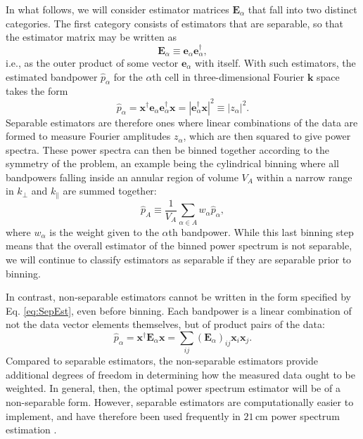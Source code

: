 \documentclass[twocolumn,aps,prd,nofootinbib,showpacs]{revtex4-1}
\begin{document}
In what follows, we will consider estimator matrices $\mathbf{E}_\alpha$ that fall into two distinct categories.  The first category consists of estimators that are separable, so that the estimator matrix may be written as
\begin{equation}
\label{eq:SepEst}
\mathbf{E}_\alpha \equiv \mathbf{e}_\alpha \mathbf{e}_\alpha^\dagger,
\end{equation}
i.e., as the outer product of some vector $\mathbf{e}_\alpha$ with itself.  With such estimators, the estimated bandpower $\widehat{p}_\alpha$ for the $\alpha$th cell in three-dimensional Fourier $\mathbf{k}$ space  takes the form
\begin{equation}
\label{eq:PreBinSepEst}
\widehat{p}_\alpha = \mathbf{x}^\dagger \mathbf{e}_\alpha \mathbf{e}_\alpha^\dagger \mathbf{x} = | \mathbf{e}_\alpha^\dagger \mathbf{x} |^2 \equiv | z_\alpha |^2.
\end{equation}
Separable estimators are therefore ones where linear combinations of the data are formed to measure Fourier amplitudes $z_\alpha$, which are then squared to give power spectra.  These power spectra can then be binned together according to the symmetry of the problem, an example being the cylindrical binning where all bandpowers falling inside an annular region of volume $V_A$ within a narrow range in $k_\perp$ and $k_\parallel$ are summed together:
\begin{equation}
\widehat{p}_A \equiv \frac{1}{V_A} \sum_{\alpha \in A} w_\alpha \widehat{p}_\alpha,
\end{equation}
where $w_\alpha$ is the weight given to the $\alpha$th bandpower.  While this last binning step means that the overall estimator of the binned power spectrum is not separable, we will continue to classify estimators as separable if they are separable prior to binning.

In contrast, non-separable estimators cannot be written in the form specified by Eq. \eqref{eq:SepEst}, even before binning.  Each bandpower is a linear combination of not the data vector elements themselves, but of product pairs of the data:
\begin{equation}
\label{eq:NonSepEst}
\widehat{p}_\alpha =  \mathbf{x}^\dagger \mathbf{E}_\alpha \mathbf{x} = \sum_{ij} (\mathbf{E}_\alpha)_{ij} \mathbf{x}_i \mathbf{x}_j.
\end{equation}
Compared to separable estimators, the non-separable estimators provide additional degrees of freedom in determining how the measured data ought to be weighted.  In general, then, the optimal power spectrum estimator will be of a non-separable form.  However, separable estimators are computationally easier to implement, and have therefore been used frequently in $21\,\textrm{cm}$ power spectrum estimation \cite{Bernardi2013,Pober2013b,Parsons2013}.
\end{document}
